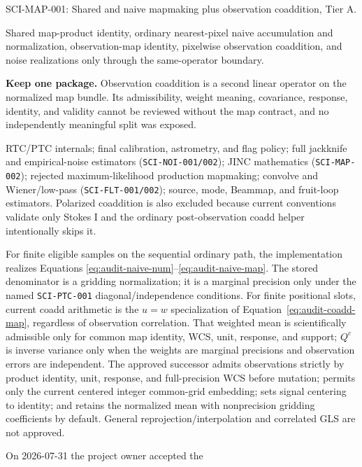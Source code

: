 \documentclass[11pt]{article}
\newcommand{\code}[1]{\nolinkurl{#1}}
\newcommand{\AuditPackageID}{SCI-MAP-001}
\newcommand{\AuditPackageName}{Shared and naive mapmaking plus observation coaddition}
\newcommand{\AuditTier}{A}
\begin{document}
\begin{description}[style=nextline]
\raggedright
\item[Package and tier] \AuditPackageID: \AuditPackageName, Tier \AuditTier.
\item[Included transformation] Shared map-product identity, ordinary
nearest-pixel naive accumulation and normalization, observation-map identity,
pixelwise observation coaddition, and noise realizations only through the
same-operator boundary.
\item[Coherence decision] \textbf{Keep one package.}  Observation coaddition is
a second linear operator on the normalized map bundle.  Its admissibility,
weight meaning, covariance, response, identity, and validity cannot be reviewed
without the map contract, and no independently meaningful split was exposed.
\item[Explicit exclusions] RTC/PTC internals; final calibration, astrometry, and
flag policy; full jackknife and empirical-noise estimators
(\code{SCI-NOI-001/002}); JINC mathematics (\code{SCI-MAP-002}); rejected
maximum-likelihood production mapmaking; convolve and Wiener/low-pass
(\code{SCI-FLT-001/002}); source, mode, Beammap, and fruit-loop estimators.
Polarized coaddition is also excluded because current conventions validate only
Stokes I and the ordinary post-observation coadd helper intentionally skips it.
\item[Strongest supported conclusion] For finite eligible samples on the
sequential ordinary path, the implementation realizes Equations
\eqref{eq:audit-naive-num}--\eqref{eq:audit-naive-map}.  The stored denominator
is a gridding normalization; it is a marginal precision only under the named
\code{SCI-PTC-001} diagonal/independence conditions.  For finite positional
slots, current coadd arithmetic is the \(u=w\) specialization of
Equation~\eqref{eq:audit-coadd-map}, regardless of observation correlation.
That weighted mean is scientifically admissible only for common map identity,
WCS, unit, response, and support; \(Q^c\) is inverse variance only when the
weights are marginal precisions and observation errors are independent.
The approved successor admits observations strictly by product identity,
unit, response, and full-precision WCS before mutation; permits only the
current centered integer common-grid embedding; sets signal centering to
identity; and retains the normalized mean with nonprecision gridding
coefficients by default.  General reprojection/interpolation and correlated
GLS are not approved.
\item[Owner decision] On 2026-07-31 the project owner accepted the

\end{description}
\end{document}
